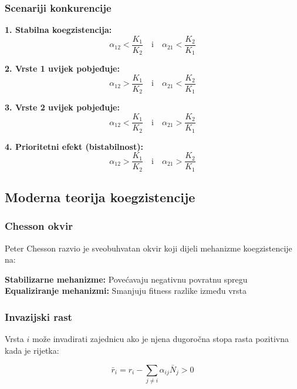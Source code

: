 \documentclass[11pt,oneside]{book}
\begin{document}
\subsubsection{Scenariji konkurencije}

\textbf{1. Stabilna koegzistencija:}
\begin{equation}
	\alpha_{12} < \frac{K_1}{K_2} \quad \text{i} \quad \alpha_{21} < \frac{K_2}{K_1}
\end{equation}

\textbf{2. Vrste 1 uvijek pobjeđuje:}
\begin{equation}
	\alpha_{12} > \frac{K_1}{K_2} \quad \text{i} \quad \alpha_{21} < \frac{K_2}{K_1}
\end{equation}

\textbf{3. Vrste 2 uvijek pobjeđuje:}
\begin{equation}
	\alpha_{12} < \frac{K_1}{K_2} \quad \text{i} \quad \alpha_{21} > \frac{K_2}{K_1}
\end{equation}

\textbf{4. Prioritetni efekt (bistabilnost):}
\begin{equation}
	\alpha_{12} > \frac{K_1}{K_2} \quad \text{i} \quad \alpha_{21} > \frac{K_2}{K_1}
\end{equation}

\subsection{Moderna teorija koegzistencije}

\subsubsection{Chesson okvir}

Peter Chesson razvio je sveobuhvatan okvir koji dijeli mehanizme koegzistencije na:

\textbf{Stabilizarne mehanizme:} Povećavaju negativnu povratnu spregu
\textbf{Equaliziranje mehanizmi:} Smanjuju fitness razlike između vrsta

\subsubsection{Invazijski rast}

Vrsta $i$ može invadirati zajednicu ako je njena dugoročna stopa rasta pozitivna kada je rijetka:

\begin{equation}
	\bar{r}_i = r_i - \sum_{j \neq i} \alpha_{ij} \bar{N}_j > 0
\end{equation}
\end{document}
